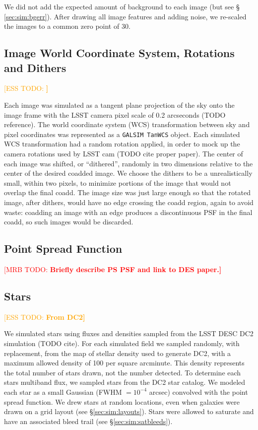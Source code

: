 \documentclass[iop, twocolappendix, appendixfloats, numberedappendix, apj]{hackemulateapj}
\newcommand{\mattodo}[1]{\textcolor{red}{[MRB TODO: \bf #1]}}
\newcommand{\esstodo}[1]{\textcolor{orange}{[ESS TODO: \bf #1]}}
\newcommand{\galsim}{\texttt{GALSIM}}
\begin{document}
We did not add the expected amount of background to each image (but see \S
\ref{sec:sim:bgerr}).  After drawing all image features and adding
noise, we re-scaled the images to a common zero point of 30.

\subsection{Image World Coordinate System, Rotations and Dithers} \label{sec:sim:rotdith}
\esstodo{}

Each image was simulated as a tangent plane projection of the sky onto the
image frame with the LSST camera pixel scale of 0.2 arcseconds (TODO reference).
The world coordinate system (WCS) transformation between sky and pixel
coordinates was represented as a \galsim\ \texttt{TanWCS} object.  Each
simulated WCS transformation had a random rotation applied, in order to mock up
the camera rotations used by LSST cam (TODO cite proper paper).  The center of
each image was shifted, or ``dithered'', randomly in two dimensions relative to
the center of the desired coadded image.  We choose the dithers to be a
unrealistically small, within two pixels, to minimize portions of the image
that would not overlap the final coadd.  The image size was just large enough
so that the rotated image, after dithers, would have no edge crossing the coadd
region, again to avoid waste:  coadding an image with an edge produces a
discontinuous PSF in the final coadd, so such images would be discarded.

\subsection{Point Spread Function} \label{sec:sim:psfs}

\mattodo{Briefly describe PS PSF and link to DES paper.}

\subsection{Stars} \label{sec:sim:stars}
\esstodo{From DC2}

We simulated stars using fluxes and densities sampled from the LSST DESC DC2
simulation (TODO cite).  For each simulated field we sampled randomly, with
replacement, from the map of stellar density used to generate DC2, with a
maximum allowed density of 100 per square arcminute.  This density represents
the total number of stars drawn, not the number detected.  To determine each
stars multiband flux, we sampled stars from the DC2 star catalog.  We modeled
each star as a small Gaussian (FWHM $= 10^{-4}$ arcsec) convolved with the
point spread function.  We drew stars at random locations, even when galaxies
were drawn on a grid layout (see \S \ref{sec:sim:layouts}).  Stars were allowed
to saturate and have an associated bleed trail (see
\S \ref{sec:sim:satbleeds}).
\end{document}

